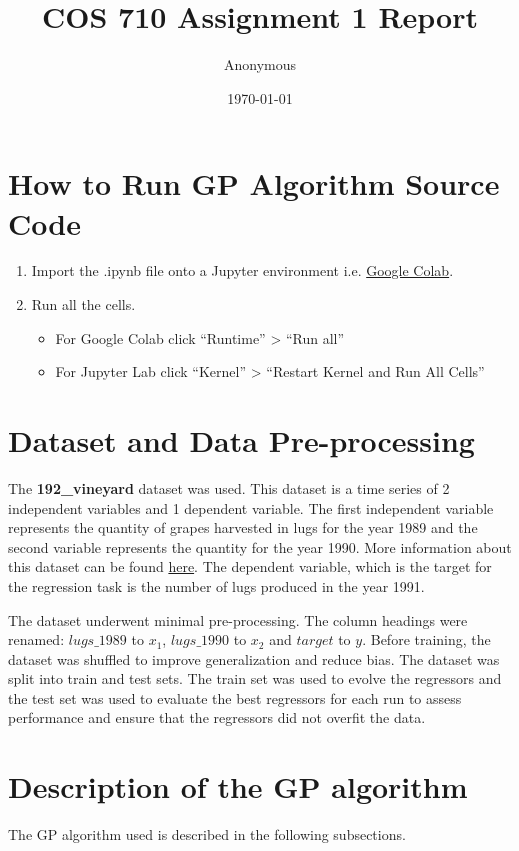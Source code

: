 \documentclass[a4paper,12pt]{article}
\title{COS 710 Assignment 1 Report}
\author{Anonymous}
\date{\today}
\begin{document}
\maketitle
\newpage

\section{How to Run GP Algorithm Source Code}
\begin{enumerate}
    \item Import the .ipynb file onto a Jupyter environment i.e. \href{https://colab.google/}{Google Colab}.
    \item Run all the cells.
          \begin{itemize}
              \item For Google Colab click ``Runtime'' > ``Run all''
              \item For Jupyter Lab click ``Kernel'' > ``Restart Kernel and Run All Cells''
          \end{itemize}
\end{enumerate}

\section{Dataset and Data Pre-processing}
The \textbf{192\_vineyard} dataset was used. This dataset is a time series of 2 independent variables and 1 dependent variable. The first independent variable represents the quantity of grapes harvested in lugs for the year 1989 and the second variable represents the quantity for the year 1990. More information about this dataset can be found \href{https://github.com/EpistasisLab/pmlb/tree/master/datasets/192_vineyard}{here}. The dependent variable, which is the target for the regression task is the number of lugs produced in the year 1991.

The dataset underwent minimal pre-processing. The column headings were renamed: $lugs\_1989$ to $x_1$, $lugs\_1990$ to $x_2$ and $target$ to $y$. Before training, the dataset was shuffled to improve generalization and reduce bias. The dataset was split into train and test sets. The train set was used to evolve the regressors and the test set was used to evaluate the best regressors for each run to assess performance and ensure that the regressors did not overfit the data.

\section{Description of the GP algorithm}
The GP algorithm used is described in the following subsections.
\end{document}
